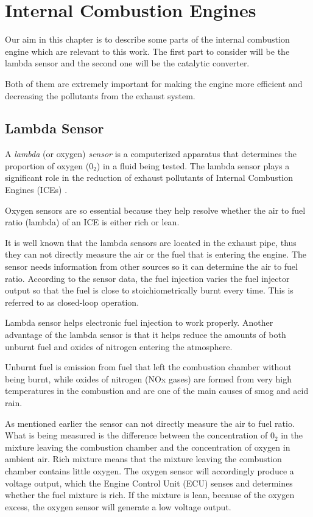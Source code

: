 \chapter{Internal Combustion Engines}\label{ch:2}
Our aim in this chapter is to describe some parts of the internal combustion engine which are relevant to this work. The first part to consider will be the lambda sensor and the second one will be the catalytic converter.

Both of them are extremely important for making the engine more efficient and decreasing the pollutants from the exhaust system.

\section{Lambda Sensor}
A \textit{lambda} (or oxygen) \textit{sensor} is a computerized apparatus that determines the proportion of oxygen ($0_2$) in a fluid being tested.  The lambda sensor plays a significant role in the reduction of exhaust pollutants of Internal Combustion Engines (ICEs) \cite{Nielsen_2000} .

Oxygen sensors are so essential because they help resolve whether the air to fuel ratio (lambda) of an ICE is either rich or lean.

It is well known that the lambda sensors are located in the exhaust pipe, thus they can not directly measure the air or the fuel that is entering the engine. The sensor needs information from other sources so it can determine the air to fuel ratio. According to the sensor data, the fuel injection varies the fuel injector output so that the fuel is close to stoichiometrically burnt every time. This is referred to as closed-loop operation. 

Lambda sensor helps electronic fuel injection to work properly. Another advantage of the lambda sensor is that it helps reduce the amounts of both unburnt fuel and oxides of nitrogen entering the atmosphere.
 
Unburnt fuel is emission from fuel that left the combustion chamber without being burnt, while oxides of nitrogen (NOx gases) are formed from very high temperatures in the combustion and are one of the main causes of smog and acid rain.
 
As mentioned earlier the sensor can not directly measure the air to fuel ratio. What is being measured is the difference between the concentration of $0_{2}$ in the mixture leaving the combustion chamber and the concentration of oxygen in ambient air. Rich mixture means that the mixture leaving the combustion chamber contains little oxygen. The oxygen sensor will accordingly produce a voltage output, which the Engine Control Unit (ECU) senses and determines whether the fuel mixture is rich. If the mixture is lean, because of the oxygen excess, the oxygen sensor will generate a low voltage output.


